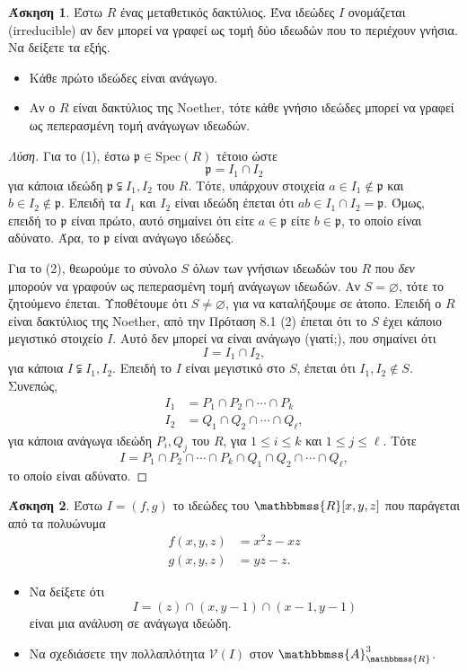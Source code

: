 \documentclass[12pt,a4paper,reqno]{amsart}
\theoremstyle{definition}
\newtheorem{exercise}{Άσκηση}
\renewcommand{\AA}{\mathbbmss{A}}
\newcommand{\RR}{\mathbbmss{R}}
\newcommand{\fp}{\mathfrak{p}}
\newcommand{\vV}{\mathcal{V}}
\renewcommand{\emptyset}{\varnothing}
\newcommand{\Spec}{\mathrm{Spec}}
\newcommand{\defn}[1]{{\color{mylightblue}{#1}}}
\begin{document}
\begin{exercise}
  \label{ex:irreducible_ideals}
  Έστω $R$ ένας μεταθετικός δακτύλιος. Ένα ιδεώδες $I$ ονομάζεται \defn{ανάγωγο} (irreducible) αν δεν μπορεί να γραφεί ως τομή δύο ιδεωδών που το περιέχουν γνήσια. Να δείξετε τα εξής. 
  \begin{itemize}
    \item[(1)] Κάθε πρώτο ιδεώδες είναι ανάγωγο. 
    \item[(2)] Αν ο $R$ είναι δακτύλιος της Noether, τότε κάθε γνήσιο ιδεώδες μπορεί να γραφεί ως πεπερασμένη τομή ανάγωγων ιδεωδών.
  \end{itemize} 
\end{exercise}

\begin{proof}[Λύση]
  Για το (1), έστω $\fp \in \Spec(R)$ τέτοιο ώστε 
  \[
  \fp = I_1 \cap I_2
  \]
  για κάποια ιδεώδη $\fp\subsetneqq I_1, I_2$ του $R$. Τότε, υπάρχουν στοιχεία $a \in I_1 \notin \fp$ και $b \in I_2 \notin \fp$. Επειδή τα $I_1$ και $I_2$ είναι ιδεώδη έπεται ότι $ab \in I_1\cap I_2 = \fp$. Όμως, επειδή το $\fp$ είναι πρώτο, αυτό σημαίνει ότι είτε $a \in \fp$ είτε $b \in \fp$, το οποίο είναι αδύνατο. Άρα, το $\fp$ είναι ανάγωγο ιδεώδες.

  Για το (2), θεωρούμε το σύνολο $S$ όλων των γνήσιων ιδεωδών του $R$ που \emph{δεν} μπορούν να γραφούν ως πεπερασμένη τομή ανάγωγων ιδεωδών. Αν $S = \emptyset$, τότε το ζητούμενο έπεται. Υποθέτουμε ότι $S \neq \emptyset$, για να καταλήξουμε σε άτοπο. Επειδή ο $R$ είναι δακτύλιος της Noether, από την Πρόταση 8.1 (2) έπεται ότι το $S$ έχει κάποιο μεγιστικό στοιχείο $I$. Αυτό δεν μπορεί να είναι ανάγωγο (γιατί;), που σημαίνει ότι 
  \[
  I = I_1 \cap I_2,
  \]
  για κάποια $I \subsetneqq I_1, I_2$. Επειδή το $I$ είναι μεγιστικό στο $S$, έπεται ότι $I_1, I_2 \notin S$. Συνεπώς, 
  \begin{align*}
  I_1 &= P_1 \cap P_2 \cap \cdots \cap P_k \\
  I_2 &= Q_1 \cap Q_2 \cap \cdots \cap Q_\ell,
  \end{align*}
  για κάποια ανάγωγα ιδεώδη $P_i, Q_j$ του $R$, για $1 \le i \le k$ και $1 \le j \le \ell$. Τότε 
  \[
  I = P_1 \cap P_2 \cap \cdots \cap P_k \cap Q_1 \cap Q_2 \cap \cdots \cap Q_\ell,
  \]
  το οποίο είναι αδύνατο.
\end{proof}

\begin{exercise}
  \label{ex:ag}
  Έστω $I = (f,g)$ το ιδεώδες του $\RR[x,y,z]$ που παράγεται από τα πολυώνυμα 
  \begin{align*}
    f(x,y,z) &= x^2z - xz \\
    g(x,y,z) &= yz - z.
  \end{align*}
  \begin{itemize}
    \item[(1)] Να δείξετε ότι 
    \[
    I = (z) \cap (x, y-1) \cap (x-1, y-1)
    \]
    είναι μια ανάλυση σε ανάγωγα ιδεώδη.
    \item[(2)] Να σχεδιάσετε την πολλαπλότητα $\vV(I)$ στον $\AA_\RR^3$.
  \end{itemize}
\end{exercise}
\end{document}
